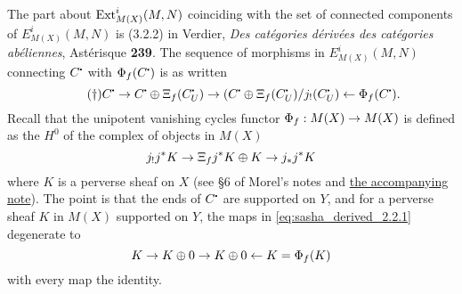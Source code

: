 \documentclass[deligne.tex]{subfiles}
\begin{document}
The part about $\operatorname{Ext}^i_{M(X)}(M,N)$ coinciding with the set of connected
components of $E^i_{M(X)}(M,N)$ is (3.2.2) in Verdier,
\emph{Des catégories dérivées des catégories abéliennes},
Astérisque \textbf{239}.
The sequence of morphisms in $E^i_{M(X)}(M,N)$ connecting $C^\dotp$ with
$\Phi_f(C^\dotp)$ is as written
\begin{equation*}\tag{$\dagger$}\label{eq:sasha_derived_2.2.1}
	C^\dotp\ra C^\dotp\oplus\Xi_f(C^\dotp_U)\ra 
	(C^\dotp\oplus\Xi_f(C^\dotp_U)/j_!(C^\dotp_U)\leftarrow\Phi_f(C^\dotp).
\end{equation*}
Recall that the unipotent vanishing cycles functor $\Phi_f:M(X)\rightarrow M(X)$ is
defined as the $H^0$ of the complex of objects in $M(X)$
\begin{equation*}
	j_!j^*K\rightarrow\Xi_f j^*K\oplus K\rightarrow j_*j^*K
\end{equation*}
where $K$ is a perverse sheaf on $X$ (see \S6 of Morel's notes and
\hyperref[sec:MorelPhi]{the accompanying note}).
The point is that the ends of $C^\dotp$ are supported on $Y$, and for a
perverse sheaf $K$ in $M(X)$ supported on $Y$, the maps in
\eqref{eq:sasha_derived_2.2.1} degenerate to
\begin{equation*}
	K\rightarrow K\oplus0\rightarrow K\oplus0\leftarrow K=\Phi_f(K)
\end{equation*}
with every map the identity.
\end{document}
